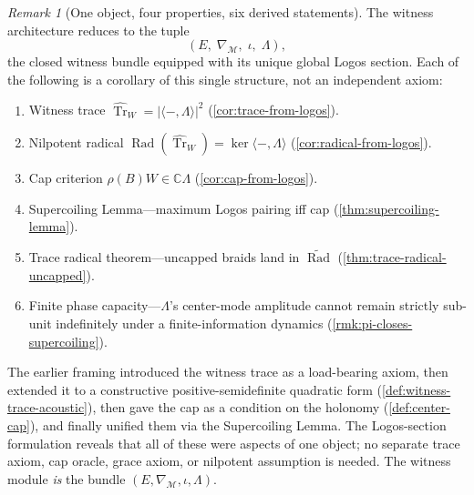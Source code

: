 \documentclass[11pt,a4paper]{article}
\theoremstyle{plain}
\theoremstyle{definition}
\theoremstyle{remark}
\newtheorem{remark}[theorem]{Remark}
\numberwithin{equation}{section}
\newcommand{\Complex}{\mathbb{C}}
\DeclareMathOperator{\Tr}{Tr}
\DeclareMathOperator{\Rad}{Rad}
\begin{document}
\begin{remark}[One object, four properties, six derived statements]
\label{rmk:logos-load-bearing}
The witness architecture reduces to the tuple
\[
  \boxed{\;(E,\;\nabla_{\mathcal{M}},\;\iota,\;\Lambda),\;}
\]
the closed witness bundle equipped with its unique global Logos
section.  Each of the following is a corollary of this single
structure, not an independent axiom:
\begin{enumerate}
  \item Witness trace
        $\widehat{\Tr}_W=|\langle-,\Lambda\rangle|^2$
        (\cref{cor:trace-from-logos}).
  \item Nilpotent radical
        $\Rad(\widehat{\Tr}_W)=\ker\langle-,\Lambda\rangle$
        (\cref{cor:radical-from-logos}).
  \item Cap criterion $\rho(B)W\in\Complex\Lambda$
        (\cref{cor:cap-from-logos}).
  \item Supercoiling Lemma---maximum Logos pairing iff cap
        (\cref{thm:supercoiling-lemma}).
  \item Trace radical theorem---uncapped braids land in
        $\widetilde{\Rad}$ (\cref{thm:trace-radical-uncapped}).
  \item Finite phase capacity---$\Lambda$'s center-mode amplitude
        cannot remain strictly sub-unit indefinitely under a
        finite-information dynamics
        (\cref{rmk:pi-closes-supercoiling}).
\end{enumerate}
The earlier framing introduced the witness trace as a load-bearing
axiom, then extended it to a constructive
positive-semidefinite quadratic form
(\cref{def:witness-trace-acoustic}), then gave the cap as a
condition on the holonomy (\cref{def:center-cap}), and finally
unified them via the Supercoiling Lemma.  The Logos-section
formulation reveals that all of these were aspects of one object;
no separate trace axiom, cap oracle, grace axiom, or nilpotent
assumption is needed.  The witness module \emph{is} the bundle
$(E,\nabla_{\mathcal{M}},\iota,\Lambda)$.
\end{remark}
\end{document}
